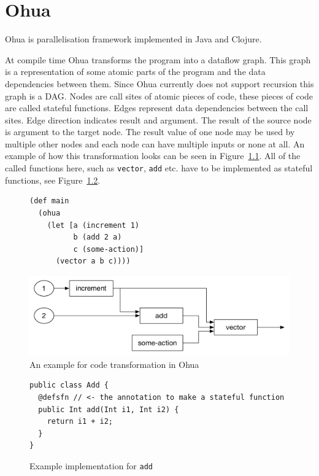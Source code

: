 \chapter{Ohua}

\label{ch:Ohua}

Ohua\cite{Ertel:2015:OID:2807426.2807431}\cite{Ohua:library:link} is parallelisation framework implemented in Java\cite{JavaLanguage} and Clojure\cite{ClojureLanguage}.

At compile time Ohua transforms the program into a dataflow graph.
This graph is a representation of some atomic parts of the program and the data dependencies between them.
Since Ohua currently does not support recursion this graph is a DAG.
Nodes are call sites of atomic pieces of code, these pieces of code are called stateful functions.
Edges represent data dependencies between the call sites.
Edge direction indicates result and argument.
The result of the source node is argument to the target node.
The result value of one node may be used by multiple other nodes and each node can have multiple inputs or none at all.
An example of how this transformation looks can be seen in Figure~\ref{fig:ohua-code-example}.
All of the called functions here, such as \texttt{vector}, \texttt{add} etc. have to be implemented as stateful functions, see Figure~\ref{fig:ohua-sfn-example}.

\begin{figure}[h]
\begin{verbatim}
(def main
  (ohua
    (let [a (increment 1)
          b (add 2 a)
          c (some-action)]
      (vector a b c))))
\end{verbatim}
\includegraphics[width=\linewidth]{../Figures/ohua-code-example}
\caption{An example for code transformation in Ohua}
\label{fig:ohua-code-example}
\end{figure}

\begin{figure}[h]
\begin{verbatim}
public class Add {
  @defsfn // <- the annotation to make a stateful function
  public Int add(Int i1, Int i2) {
    return i1 + i2;
  }
}
\end{verbatim}
\caption{Example implementation for \texttt{add}}
\label{fig:ohua-sfn-example}
\end{figure}

